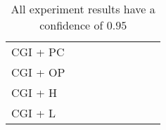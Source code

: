 \begin{table}
\begin{tabular}{l|l|l|l|l|l|l|l}
    CGI + PC  & ~                                                                                    & ~ \\
    CGI + OP  & ~                                                                                    & ~ \\
    CGI + H   & ~                                                                                    & ~ \\
    CGI + L   & ~                                                                                    & ~ \\
    \end{tabular}
    \caption{All experiment results have a confidence of $0.95$}
\end{table}